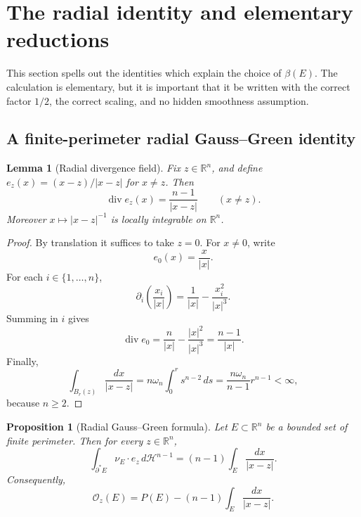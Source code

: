 \documentclass[11pt]{amsart}
\newtheorem{proposition}[theorem]{Proposition}
\newtheorem{lemma}[theorem]{Lemma}
\theoremstyle{definition}
\newcommand{\R}{\mathbb R}
\newcommand{\Hn}{\mathcal H^{n-1}}
\newcommand{\Per}{P}
\newcommand{\osc}{\mathcal O}
\begin{document}
\section{The radial identity and elementary reductions}\label{sec:identity}

This section spells out the identities which explain the choice of
\(\beta(E)\).  The calculation is elementary, but it is important that it be
written with the correct factor \(1/2\), the correct scaling, and no hidden
smoothness assumption.

\subsection{A finite-perimeter radial Gauss--Green identity}

\begin{lemma}[Radial divergence field]\label{lem:radial-div}
Fix \(z\in\R^n\), and define \(e_z(x)=(x-z)/|x-z|\) for \(x\ne z\).
Then
\[
   \operatorname{div}e_z(x)=\frac{n-1}{|x-z|}
   \qquad (x\ne z).
\tag{2.1}\label{eq:div-e}
\]
Moreover \(x\mapsto |x-z|^{-1}\) is locally integrable on \(\R^n\).
\end{lemma}

\begin{proof}
By translation it suffices to take \(z=0\).  For \(x\ne0\), write
\[
   e_0(x)=\frac{x}{|x|}.
\]
For each \(i\in\{1,\ldots,n\}\),
\[
   \partial_i\!\left(\frac{x_i}{|x|}\right)
   =\frac1{|x|}-\frac{x_i^2}{|x|^3}.
\]
Summing in \(i\) gives
\[
   \operatorname{div}e_0
   =\frac{n}{|x|}-\frac{|x|^2}{|x|^3}
   =\frac{n-1}{|x|}.
\]
Finally,
\[
   \int_{B_r(z)}\frac{dx}{|x-z|}
   =n\omega_n\int_0^r s^{n-2}\,ds
   =\frac{n\omega_n}{n-1}r^{n-1}<\infty,
\]
because \(n\ge2\).
\end{proof}

\begin{proposition}[Radial Gauss--Green formula]\label{prop:radial-GG}
Let \(E\subset\R^n\) be a bounded set of finite perimeter.  Then for every
\(z\in\R^n\),
\[
   \int_{\partial^*E}\nu_E\cdot e_z\,d\Hn
   =(n-1)\int_E\frac{dx}{|x-z|}.
\tag{2.2}\label{eq:radial-GG}
\]
Consequently,
\[
   \osc_z(E)
   =\Per(E)-(n-1)\int_E\frac{dx}{|x-z|}.
\tag{2.3}\label{eq:osc-potential}
\]
\end{proposition}
\end{document}
